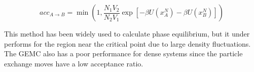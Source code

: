 \begin{equation}
acc_{A \rightarrow B} = \min \left( 1, \dfrac{N_{1}V_{2}}{N_{2}V_{1}}  \exp[-\beta U(x_{A}^{N}) -\beta U(x_{B}^{N})] \right)
\label{moleprob}
\end{equation}

This method has been widely used to calculate phase equilibrium, but it under performs for the region near the critical point due to large density fluctuations. The GEMC also has a poor performance for dense systems since the particle exchange moves have a low acceptance ratio.  





